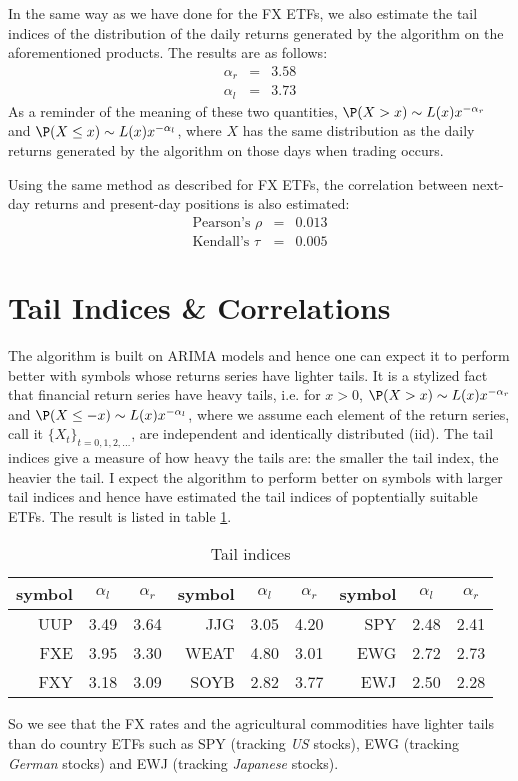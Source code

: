 \documentclass[12pt]{article}
\begin{document}
In the same way as we have done for the FX ETFs, we also estimate the
tail indices of the distribution of the daily returns generated by the
algorithm on the aforementioned products. The results are as follows:
\begin{eqnarray*}
  \alpha_r &=& 3.58 \\
  \alpha_l &=& 3.73
\end{eqnarray*}
As a reminder of the meaning of these two quantities, $\P(X > x) \sim
L(x) x^{-\alpha_r}$ and $\P(X \leq x) \sim L(x) x^{-\alpha_l}$, where
$X$ has the same distribution as the daily returns generated by the
algorithm on those days when trading occurs.

Using the same method as described for FX ETFs, the correlation
between next-day returns and present-day positions is also estimated:
\begin{eqnarray*}
  \text{Pearson's } \rho &=& 0.013 \\
  \text{Kendall's } \tau &=& 0.005
\end{eqnarray*}

\section{Tail Indices \& Correlations}\label{sec:TailIndices}
The algorithm is built on ARIMA models and hence one can expect it to
perform better with symbols whose returns series have lighter
tails. It is a stylized fact that financial return series have heavy
tails, i.e. for $x > 0$, $\P(X > x)\sim L(x) x^{-\alpha_r}$ and
$\P(X \leq -x)\sim L(x) x^{-\alpha_l}$, where we assume each element
of the return series, call it $\{X_t\}_{t=0,1,2,\dots}$, are
independent and identically distributed (iid). The tail indices give a
measure of how heavy the tails are: the smaller the tail index, the
heavier the tail. I expect the algorithm to perform better on symbols
with larger tail indices and hence have estimated the tail indices of
poptentially suitable ETFs. The result is listed in table
\ref{tab:TailIndices}.
\begin{table}[htb!]
  \centering
  \begin{tabular}{r|c|c||r|c|c||r|c|c}
    symbol & $\alpha_l$ & $\alpha_r$
    & symbol & $\alpha_l$ & $\alpha_r$
    & symbol & $\alpha_l$ & $\alpha_r$ \\
    \hline
    UUP & 3.49 & 3.64 
    & JJG & 3.05 & 4.20 
    & SPY & 2.48 & 2.41 \\
    FXE & 3.95 & 3.30 
    & WEAT & 4.80 & 3.01
    & EWG & 2.72 & 2.73 \\
    FXY & 3.18 & 3.09 
    & SOYB & 2.82 & 3.77 
    & EWJ & 2.50 & 2.28
  \end{tabular}
  \caption{Tail indices}
  \label{tab:TailIndices}
\end{table}
So we see that the FX rates and the agricultural commodities have lighter
tails than do country ETFs such as SPY (tracking {\it US} stocks), EWG
(tracking {\it German} stocks) and EWJ (tracking {\it Japanese}
stocks).
\end{document}
